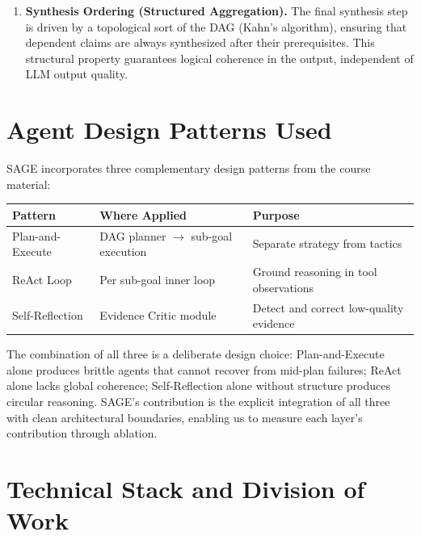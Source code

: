 \documentclass[11pt]{article}
\begin{document}
\begin{enumerate}[leftmargin=1.5em, label=\textbf{\arabic{enumi}.}, itemsep=4pt]
  \item \textbf{Synthesis Ordering (Structured Aggregation).}
  The final synthesis step is driven by a topological sort of the DAG (Kahn's algorithm), ensuring that
  dependent claims are always synthesized after their prerequisites. This structural
  property guarantees logical coherence in the output, independent of LLM output quality.

\end{enumerate}

\section{Agent Design Patterns Used}

SAGE incorporates three complementary design patterns from the course material:

\begin{center}
\begin{tabular}{@{}lll@{}}
\toprule
\textbf{Pattern} & \textbf{Where Applied} & \textbf{Purpose} \\
\midrule
Plan-and-Execute & DAG planner $\to$ sub-goal execution & Separate strategy from tactics \\
ReAct Loop       & Per sub-goal inner loop              & Ground reasoning in tool observations \\
Self-Reflection  & Evidence Critic module               & Detect and correct low-quality evidence \\
\bottomrule
\end{tabular}
\end{center}

The combination of all three is a deliberate design choice: Plan-and-Execute alone
produces brittle agents that cannot recover from mid-plan failures; ReAct alone lacks
global coherence; Self-Reflection alone without structure produces circular reasoning.
SAGE's contribution is the explicit integration of all three with clean architectural
boundaries, enabling us to measure each layer's contribution through ablation.

\section{Technical Stack and Division of Work}
\end{document}
